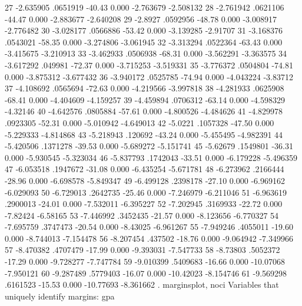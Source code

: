          27  {\VBAR}  -2.635905   .0651919   -40.43   0.000    -2.763679   -2.508132
         28  {\VBAR}  -2.761942   .0621106   -44.47   0.000    -2.883677   -2.640208
         29  {\VBAR}    -2.8927   .0592956   -48.78   0.000    -3.008917   -2.776482
         30  {\VBAR}  -3.028177   .0566886   -53.42   0.000    -3.139285    -2.91707
         31  {\VBAR}  -3.168376   .0543021   -58.35   0.000    -3.274806   -3.061945
         32  {\VBAR}  -3.313294   .0522364   -63.43   0.000    -3.415675   -3.210913
         33  {\VBAR}  -3.462933   .0506938   -68.31   0.000    -3.562291   -3.363575
         34  {\VBAR}  -3.617292    .049981   -72.37   0.000    -3.715253   -3.519331
         35  {\VBAR}  -3.776372   .0504804   -74.81   0.000    -3.875312   -3.677432
         36  {\VBAR}  -3.940172   .0525785   -74.94   0.000    -4.043224    -3.83712
         37  {\VBAR}  -4.108692   .0565694   -72.63   0.000    -4.219566   -3.997818
         38  {\VBAR}  -4.281933   .0625908   -68.41   0.000    -4.404609   -4.159257
         39  {\VBAR}  -4.459894   .0706312   -63.14   0.000    -4.598329    -4.32146
         40  {\VBAR}  -4.642576   .0805884   -57.61   0.000    -4.800526   -4.484626
         41  {\VBAR}  -4.829978   .0923305   -52.31   0.000    -5.010942   -4.649013
         42  {\VBAR}    -5.0221   .1057328   -47.50   0.000    -5.229333   -4.814868
         43  {\VBAR}  -5.218943    .120692   -43.24   0.000    -5.455495   -4.982391
         44  {\VBAR}  -5.420506   .1371278   -39.53   0.000    -5.689272   -5.151741
         45  {\VBAR}   -5.62679   .1549801   -36.31   0.000    -5.930545   -5.323034
         46  {\VBAR}  -5.837793   .1742043   -33.51   0.000    -6.179228   -5.496359
         47  {\VBAR}  -6.053518   .1947672   -31.08   0.000    -6.435254   -5.671781
         48  {\VBAR}  -6.273962   .2166444   -28.96   0.000    -6.698578   -5.849347
         49  {\VBAR}  -6.499128   .2398178   -27.10   0.000    -6.969162   -6.029093
         50  {\VBAR}  -6.729013   .2642735   -25.46   0.000    -7.246979   -6.211046
         51  {\VBAR}  -6.963619   .2900013   -24.01   0.000    -7.532011   -6.395227
         52  {\VBAR}  -7.202945   .3169933   -22.72   0.000     -7.82424    -6.58165
         53  {\VBAR}  -7.446992   .3452435   -21.57   0.000    -8.123656   -6.770327
         54  {\VBAR}  -7.695759   .3747473   -20.54   0.000     -8.43025   -6.961267
         55  {\VBAR}  -7.949246   .4055011   -19.60   0.000    -8.744013   -7.154478
         56  {\VBAR}  -8.207454    .437502   -18.76   0.000    -9.064942   -7.349966
         57  {\VBAR}  -8.470382   .4707479   -17.99   0.000    -9.393031   -7.547733
         58  {\VBAR}   -8.73803   .5052372   -17.29   0.000    -9.728277   -7.747784
         59  {\VBAR}  -9.010399   .5409683   -16.66   0.000    -10.07068   -7.950121
         60  {\VBAR}  -9.287489   .5779403   -16.07   0.000    -10.42023   -8.154746
         61  {\VBAR}  -9.569298   .6161523   -15.53   0.000    -10.77693   -8.361662
{\smallskip}
. marginsplot, noci
{\smallskip}
  Variables that uniquely identify margins: gpa
{\smallskip}
